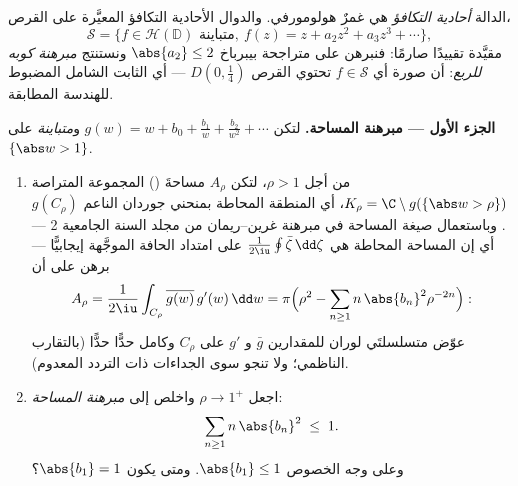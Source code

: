 \begin{problem}\label{pb:b3:conformal:1}
الدالة \emph{أحادية التكافؤ} هي غمرٌ هولومورفي. والدوال
الأحادية التكافؤ المعيَّرة على القرص،
\[
\mathcal S = \bigl\{f \in \mathcal H(\mathbb D) \text{ متباينة},\ f(z) = z + a_2z^2 + a_3z^3 + \cdots\bigr\},
\]
مقيَّدة تقييدًا صارمًا: فنبرهن على متراجحة بيبرباخ $\abs{a_2} \leq 2$
ونستنتج \emph{مبرهنة كوبه للربع}: أن صورة أي $f \in \mathcal S$ تحتوي
القرص $D(0, \frac14)$ --- أي الثابت الشامل المضبوط للهندسة
المطابقة.

\medskip
\noindent\textbf{الجزء الأول --- مبرهنة المساحة.} لتكن $g(w) = w
+ b_0 + \frac{b_1}w + \frac{b_2}{w^2} + \cdots$
 و\emph{متباينة} على $\{\abs w > 1\}$.
\begin{enumerate}
  \item من أجل $\rho > 1$، لتكن $A_\rho$ مساحةَ ()
        المجموعة المتراصة $K_\rho = \C\setminus
        g(\{\abs w > \rho\})$، أي المنطقة المحاطة
        بمنحني جوردان الناعم $g(C_\rho)$. وباستعمال صيغة
        المساحة في مبرهنة غرين--ريمان من مجلد السنة الجامعية
        2 --- أي إن المساحة المحاطة هي $\frac1{2\iu}
        \oint\bar\zeta\,\dd\zeta$ على امتداد
        الحافة الموجَّهة إيجابيًّا --- برهن على أن
        \[
        A_\rho = \frac{1}{2\iu}\int_{C_\rho}
        \overline{g(w)}\,g'(w)\,\dd w
        = \pi\Bigl(\rho^2 -
        \sum_{n\geq1}n\,\abs{b_n}^2\rho^{-2n}\Bigr) :
        \]
        عوّض متسلسلتَي لوران للمقدارين $\bar g$ و $g'$ على
        $C_\rho$ وكامل حدًّا حدًّا (بالتقارب الناظمي؛ ولا تنجو
        سوى الجداءات ذات التردد المعدوم).
  \item اجعل $\rho \to 1^+$ واخلص إلى \emph{مبرهنة المساحة}:
        \[
        \sum_{n\geq1}n\,\abs{b_n}^2 \;\leq\; 1 .
        \]
        وعلى وجه الخصوص $\abs{b_1} \leq 1$. ومتى يكون $\abs{b_1}
        = 1$؟
\end{enumerate}


\end{problem}

